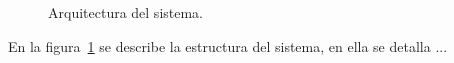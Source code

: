 \begin{figure}[htbp!]
	\begin{center}
		\caption{Arquitectura del sistema.}
		\label{fig:arquitectura}
	\end{center}
\end{figure}

En la figura~\ref{fig:arquitectura} se describe la estructura del sistema, en ella se detalla ...

